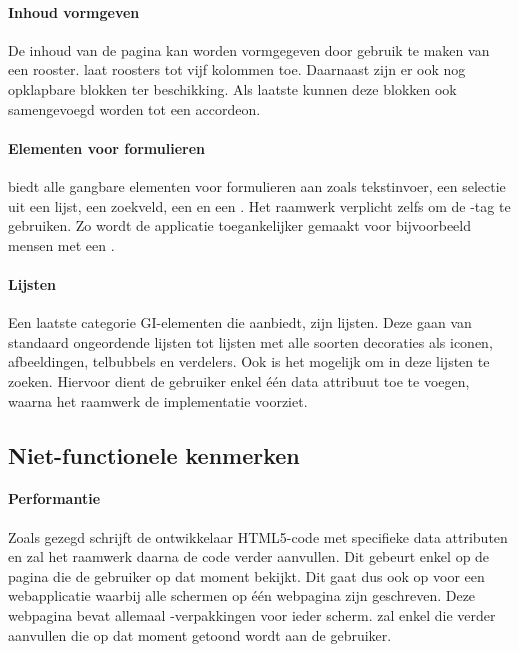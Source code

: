 \paragraph{Inhoud vormgeven}
De inhoud van de pagina kan worden vormgegeven door gebruik te maken van een rooster. 
\jqm{} laat roosters tot vijf kolommen toe. 
Daarnaast zijn er ook nog opklapbare blokken ter beschikking. 
Als laatste kunnen deze blokken ook samengevoegd worden tot een accordeon. 

\paragraph{Elementen voor formulieren}
\jqm{} biedt alle gangbare elementen voor formulieren aan zoals tekstinvoer, een selectie uit een lijst, een zoekveld, een  en een . 
Het raamwerk verplicht zelfs om de -tag te gebruiken. 
Zo wordt de applicatie toegankelijker gemaakt voor bijvoorbeeld mensen met een .

\paragraph{Lijsten}
Een laatste categorie GI-elementen die \jqm{} aanbiedt, zijn lijsten. 
Deze gaan van standaard ongeordende lijsten tot lijsten met alle soorten decoraties als iconen, afbeeldingen, telbubbels en verdelers. 
Ook is het mogelijk om in deze lijsten te zoeken. 
Hiervoor dient de gebruiker enkel één data attribuut toe te voegen, waarna het raamwerk de implementatie voorziet. 

\subsection{Niet-functionele kenmerken}
\paragraph{Performantie}
Zoals gezegd schrijft de ontwikkelaar HTML5-code met specifieke data attributen en zal het raamwerk daarna de code verder aanvullen. 
Dit gebeurt enkel op de pagina die de gebruiker op dat moment bekijkt. 
Dit gaat dus ook op voor een webapplicatie waarbij alle schermen op één webpagina zijn geschreven. 
Deze webpagina bevat allemaal -verpakkingen voor ieder scherm. 
\jqm{} zal enkel die  verder aanvullen die op dat moment getoond wordt aan de gebruiker. 

